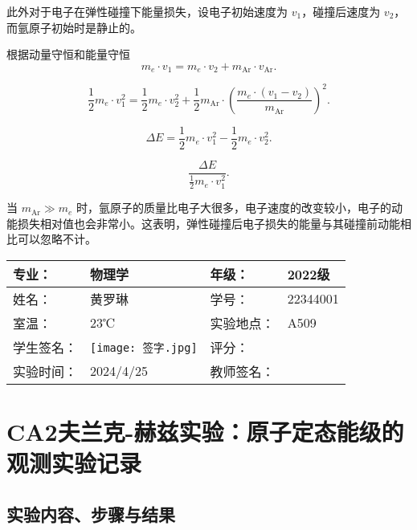 \documentclass[dvipsnames, svgnames,a4paper,11pt]{article}
\begin{document}
此外对于电子在弹性碰撞下能量损失，设电子初始速度为 \(v_1\)，碰撞后速度为 \(v_2\)，而氩原子初始时是静止的。

根据动量守恒和能量守恒
\[
m_e \cdot v_1 = m_e \cdot v_2 + m_{\text{Ar}} \cdot v_{\text{Ar}}.
\]


\[
\frac{1}{2} m_e \cdot v_1^2 = \frac{1}{2} m_e \cdot v_2^2 + \frac{1}{2} m_{\text{Ar}} \cdot \left( \frac{m_e \cdot (v_1 - v_2)}{m_{\text{Ar}}} \right)^2.
\]

\[
\Delta E = \frac{1}{2} m_e \cdot v_1^2 - \frac{1}{2} m_e \cdot v_2^2.
\]

\[
\frac{\Delta E}{\frac{1}{2} m_e \cdot v_1^2}.
\]

当 \(m_{\text{Ar}} \gg m_e\) 时，氩原子的质量比电子大很多，电子速度的改变较小，电子的动能损失相对值也会非常小。这表明，弹性碰撞后电子损失的能量与其碰撞前动能相比可以忽略不计。








	
	
	

	
	
	\clearpage
	
	\begin{table}
		\renewcommand\arraystretch{1.7}
		\centering
		\begin{tabularx}{\textwidth}{|X|X|X|X|}
			\hline
			专业： & 物理学 & 年级： & 2022级 \\
			\hline
			姓名： & 黄罗琳 & 学号： & 22344001\\
			\hline
			室温： & 23℃ & 实验地点： & A509 \\
			\hline
			学生签名：& \texttt{[image: 签字.jpg]}& 评分： &\\
			\hline
			实验时间：& 2024/4/25 & 教师签名：&\\
			\hline
		\end{tabularx}
	\end{table}
	
	\section{CA2夫兰克-赫兹实验：原子定态能级的观测\quad\heiti 实验记录}
	
	\subsection{实验内容、步骤与结果}
	
\end{document}
